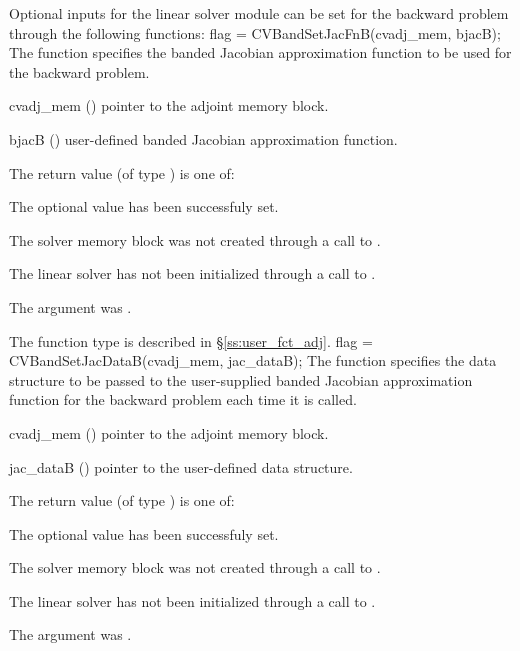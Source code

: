{}
Optional inputs for the {\cvband} linear solver module can be set for the backward
problem through the following functions:
{
  flag = CVBandSetJacFnB(cvadj\_mem, bjacB);
}
{
  The function  specifies the banded Jacobian
  approximation function to be used for the backward problem.
}
{
  \begin{args}
  \item[cvadj\_mem] ()
    pointer to the adjoint memory block.
  \item[bjacB] ()
    user-defined banded Jacobian approximation function.
  \end{args}
}
{
  The return value  (of type ) is one of:
  \begin{args}
  \item[\Id{CVBAND\_SUCCESS}] 
    The optional value has been successfuly set.
  \item[\Id{CVBAND\_MEM\_NULL}]
    The {\cvodes} solver memory block was not created through a call to .
  \item[\Id{CVBAND\_LMEM\_NULL}]
    The {\cvband} linear solver has not been initialized through a call to .
  \item[\Id{CV\_ADJMEM\_NULL}]
    The  argument was .
  \end{args}
}
{
  The function type  is described in \S\ref{ss:user_fct_adj}.
}
{
  flag = CVBandSetJacDataB(cvadj\_mem, jac\_dataB);
}
{
  The function  specifies the data structure
  to be passed to the user-supplied banded Jacobian approximation 
  function for the backward problem each time it is called.
}
{
  \begin{args}
  \item[cvadj\_mem] ()
    pointer to the adjoint memory block.
  \item[jac\_dataB] ()
    pointer to the user-defined data structure.
  \end{args}
}
{
  The return value  (of type ) is one of:
  \begin{args}
  \item[\Id{CVBAND\_SUCCESS}] 
    The optional value has been successfuly set.
  \item[\Id{CVBAND\_MEM\_NULL}]
    The {\cvodes} solver memory block was not created through a call to .
  \item[\Id{CVBAND\_LMEM\_NULL}]
    The {\cvband} linear solver has not been initialized through a call to .
  \item[\Id{CV\_ADJMEM\_NULL}]
    The  argument was .
  \end{args}
}

